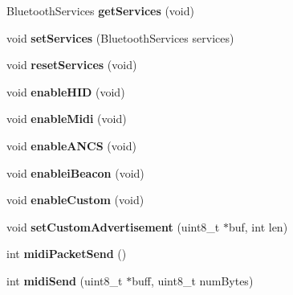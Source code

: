 \begin{DoxyCompactItemize}
\item 
\hypertarget{class_bean_class_a62ffb8be5579e756532e704bf179ab45}{}Bluetooth\+Services {\bfseries get\+Services} (void)\label{class_bean_class_a62ffb8be5579e756532e704bf179ab45}

\item 
\hypertarget{class_bean_class_a17b6e95f7b93e39ae83971ed796edd5b}{}void {\bfseries set\+Services} (Bluetooth\+Services services)\label{class_bean_class_a17b6e95f7b93e39ae83971ed796edd5b}

\item 
\hypertarget{class_bean_class_a98a040220137d9dd047250e247bd4ebd}{}void {\bfseries reset\+Services} (void)\label{class_bean_class_a98a040220137d9dd047250e247bd4ebd}

\item 
\hypertarget{class_bean_class_adbfdabc9eeefa7fbfd3730e7ed28c585}{}void {\bfseries enable\+H\+I\+D} (void)\label{class_bean_class_adbfdabc9eeefa7fbfd3730e7ed28c585}

\item 
\hypertarget{class_bean_class_accc333aef13c3b5623fb1d47b3287a0c}{}void {\bfseries enable\+Midi} (void)\label{class_bean_class_accc333aef13c3b5623fb1d47b3287a0c}

\item 
\hypertarget{class_bean_class_a0e2c4b0072c432729d967e4ecb51b5f7}{}void {\bfseries enable\+A\+N\+C\+S} (void)\label{class_bean_class_a0e2c4b0072c432729d967e4ecb51b5f7}

\item 
\hypertarget{class_bean_class_a31d4e4fa7d66ddf1988e456ecbf9dc58}{}void {\bfseries enablei\+Beacon} (void)\label{class_bean_class_a31d4e4fa7d66ddf1988e456ecbf9dc58}

\item 
\hypertarget{class_bean_class_a9bbcf8d6db2a229d12838b2626e514d0}{}void {\bfseries enable\+Custom} (void)\label{class_bean_class_a9bbcf8d6db2a229d12838b2626e514d0}

\item 
\hypertarget{class_bean_class_add3cfcf31fe80a72bf6e4cf2cdaf99bb}{}void {\bfseries set\+Custom\+Advertisement} (uint8\+\_\+t $\ast$buf, int len)\label{class_bean_class_add3cfcf31fe80a72bf6e4cf2cdaf99bb}

\item 
\hypertarget{class_bean_class_ad03f5206f38ab4469fce416904ef613d}{}int {\bfseries midi\+Packet\+Send} ()\label{class_bean_class_ad03f5206f38ab4469fce416904ef613d}

\item 
\hypertarget{class_bean_class_aef4497374c64f99746ef1da28251221f}{}int {\bfseries midi\+Send} (uint8\+\_\+t $\ast$buff, uint8\+\_\+t num\+Bytes)\label{class_bean_class_aef4497374c64f99746ef1da28251221f}


\end{DoxyCompactItemize}
